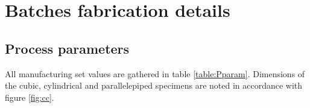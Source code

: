 
\chapter{Batches fabrication details} %

\label{AppendixA} %

\section{Process parameters}
\label{ppa}
All manufacturing set values are gathered in table \ref{table:Pparam}. Dimensions of the cubic, cylindrical and parallelepiped specimens are noted in accordance with figure \ref{fig:cc}.\\
